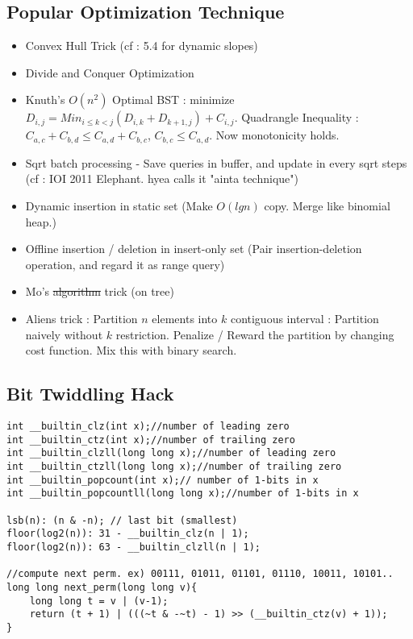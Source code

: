 \documentclass[landscape, 10pt, a4paper, oneside,  twocolumn]{article}
\begin{document}
\subsection {Popular Optimization Technique}
\begin{itemize}
	\item Convex Hull Trick (cf : 5.4 for dynamic slopes)
	\item Divide and Conquer Optimization
	\item Knuth's $O(n^2)$ Optimal BST : minimize $D_{i, j} = Min_{i \leq k < j}(D_{i, k} + D_{k+1, j}) + C_{i, j}$. Quadrangle Inequality : $C_{a, c} + C_{b, d} \leq C_{a, d} + C_{b, c}$, $C_{b, c} \leq C_{a, d}$. Now monotonicity holds. 
	\item Sqrt batch processing - Save queries in buffer, and update in every sqrt steps (cf : IOI 2011 Elephant. hyea calls it "ainta technique")
	\item Dynamic insertion in static set (Make $O(lgn)$ copy. Merge like binomial heap.)
	\item Offline insertion / deletion in insert-only set (Pair insertion-deletion operation, and regard it as range query)
	\item Mo's \sout{algorithm} trick (on tree)
	\item Aliens trick : Partition $n$ elements into $k$ contiguous interval : Partition naively without $k$ restriction. Penalize / Reward the partition by changing cost function. Mix this with binary search.
\end{itemize}

\subsection {Bit Twiddling Hack}
\begin{verbatim}
int __builtin_clz(int x);//number of leading zero
int __builtin_ctz(int x);//number of trailing zero
int __builtin_clzll(long long x);//number of leading zero
int __builtin_ctzll(long long x);//number of trailing zero
int __builtin_popcount(int x);// number of 1-bits in x
int __builtin_popcountll(long long x);//number of 1-bits in x

lsb(n): (n & -n); // last bit (smallest)
floor(log2(n)): 31 - __builtin_clz(n | 1); 
floor(log2(n)): 63 - __builtin_clzll(n | 1);

//compute next perm. ex) 00111, 01011, 01101, 01110, 10011, 10101..
long long next_perm(long long v){
	long long t = v | (v-1);
	return (t + 1) | (((~t & -~t) - 1) >> (__builtin_ctz(v) + 1));
}
\end{verbatim}
\end{document}
